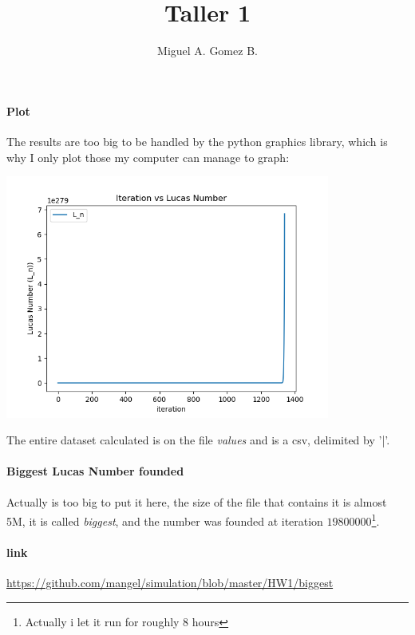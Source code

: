 \documentclass{article}
\title{Taller 1}
\author{Miguel A. Gomez B.}
\begin{document}
	\maketitle

\paragraph{Plot} The results are too big to be handled by the python graphics library, which is why I only plot those my computer can manage to graph:
\begin{center}
	\includegraphics[width=0.8\textwidth]{Plot}
\end{center}

The entire dataset calculated is on the file \textit{values} and is a csv, delimited by '|'.

\paragraph{Biggest Lucas Number founded}
\paragraph{} Actually is too big to put it here, the size of the file that contains it is almost 5M, it is called \textit{biggest}, and the number was founded at iteration $19800000$\footnote{Actually i let it run for roughly 8 hours}.\\

\paragraph{link} \url{https://github.com/mangel/simulation/blob/master/HW1/biggest}
\end{document}
